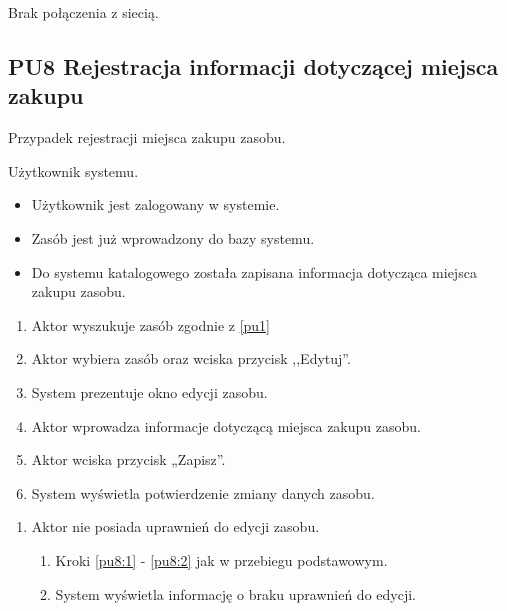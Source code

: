 Brak połączenia z siecią.

\subsection{PU8 Rejestracja informacji dotyczącej miejsca zakupu} \label{pu8}
Przypadek rejestracji miejsca zakupu zasobu.

Użytkownik systemu.

\begin{itemize}
\item Użytkownik jest zalogowany w systemie.
\item Zasób jest już wprowadzony do bazy systemu.
\end{itemize}

\begin{itemize}
\item Do systemu katalogowego została zapisana informacja dotycząca miejsca zakupu zasobu.
\end{itemize}

\begin{enumerate}
	\item \label{pu8:1} Aktor wyszukuje zasób zgodnie z \ref{pu1}
	\item \label{pu8:2} Aktor wybiera zasób oraz wciska przycisk ,,Edytuj''.
	\item System prezentuje okno edycji zasobu.
	\item Aktor wprowadza informacje dotyczącą miejsca zakupu zasobu.
	\item Aktor wciska przycisk „Zapisz”.
	\item System wyświetla potwierdzenie zmiany danych zasobu.
\end{enumerate}

\begin{enumerate}
	\item Aktor nie posiada uprawnień do edycji zasobu.
	\begin{enumerate}[label*=\arabic*.]
		\item Kroki \ref{pu8:1} - \ref{pu8:2} jak w przebiegu podstawowym.
		\item System wyświetla informację o braku uprawnień do edycji.
	\end{enumerate}
\end{enumerate}

